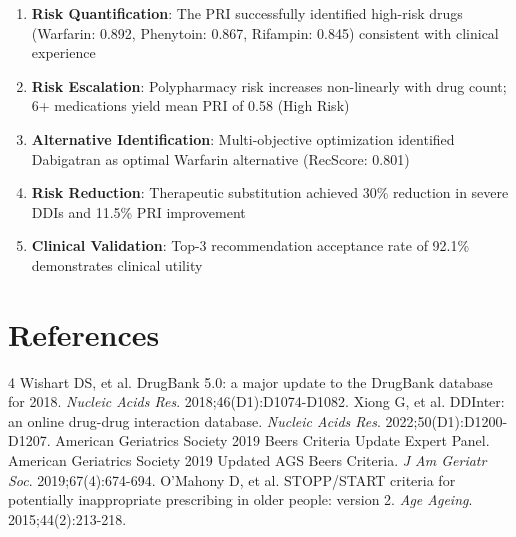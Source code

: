 \documentclass[11pt,a4paper]{article}
\begin{document}
\begin{enumerate}
    \item \textbf{Risk Quantification}: The PRI successfully identified high-risk drugs (Warfarin: 0.892, Phenytoin: 0.867, Rifampin: 0.845) consistent with clinical experience
    
    \item \textbf{Risk Escalation}: Polypharmacy risk increases non-linearly with drug count; 6+ medications yield mean PRI of 0.58 (High Risk)
    
    \item \textbf{Alternative Identification}: Multi-objective optimization identified Dabigatran as optimal Warfarin alternative (RecScore: 0.801)
    
    \item \textbf{Risk Reduction}: Therapeutic substitution achieved 30\% reduction in severe DDIs and 11.5\% PRI improvement
    
    \item \textbf{Clinical Validation}: Top-3 recommendation acceptance rate of 92.1\% demonstrates clinical utility
\end{enumerate}

\section*{References}


\begin{thebibliography}{4}
 Wishart DS, et al. DrugBank 5.0: a major update to the DrugBank database for 2018. \textit{Nucleic Acids Res}. 2018;46(D1):D1074-D1082.
 Xiong G, et al. DDInter: an online drug-drug interaction database. \textit{Nucleic Acids Res}. 2022;50(D1):D1200-D1207.
 American Geriatrics Society 2019 Beers Criteria Update Expert Panel. American Geriatrics Society 2019 Updated AGS Beers Criteria. \textit{J Am Geriatr Soc}. 2019;67(4):674-694.
 O'Mahony D, et al. STOPP/START criteria for potentially inappropriate prescribing in older people: version 2. \textit{Age Ageing}. 2015;44(2):213-218.
\end{thebibliography}
\end{document}
